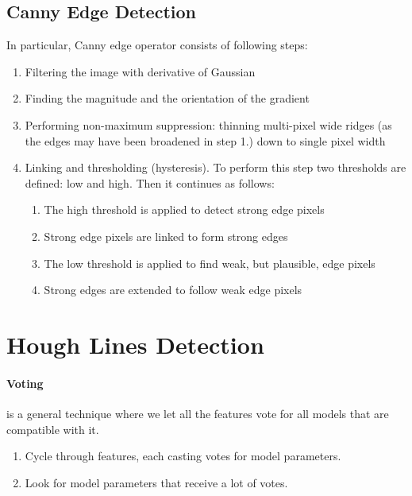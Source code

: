 \subsection{Canny Edge Detection}
In particular, Canny edge operator consists of following steps\cite{canny-edge}:
\begin{enumerate}
	\item Filtering the image with derivative of Gaussian
	\item Finding the magnitude and the orientation of the gradient
	\item Performing non-maximum suppression: thinning multi-pixel wide ridges (as the edges may have been broadened in step 1.) down to single pixel width
	\item Linking and thresholding (hysteresis). To perform this step two thresholds are defined: low and high. Then it continues as follows:
	\begin{enumerate}
		\item The high threshold is applied to detect strong edge pixels
		\item Strong edge pixels are linked to form strong edges
		\item The low threshold is applied to find weak, but plausible, edge pixels
		\item Strong edges are extended to follow weak edge pixels
	\end{enumerate}
\end{enumerate}

\section{Hough Lines Detection}\label{sec:hough_lines}
\paragraph{Voting}
is a general technique where we let all the features vote for all models that are compatible with it.
\begin{enumerate}
	\item Cycle through features, each casting votes for model parameters.
	\item Look for model parameters that receive a lot of votes.
\end{enumerate}

